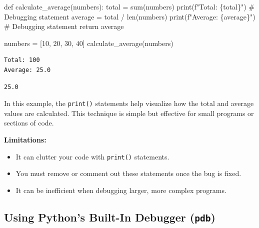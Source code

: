 \documentclass[
  letterpaper,
  DIV=11,
  numbers=noendperiod]{scrreprt}
\newenvironment{Shaded}{\begin{snugshade}}{\end{snugshade}}
\newcommand{\BuiltInTok}[1]{\textcolor[rgb]{0.00,0.23,0.31}{#1}}
\newcommand{\CommentTok}[1]{\textcolor[rgb]{0.37,0.37,0.37}{#1}}
\newcommand{\ControlFlowTok}[1]{\textcolor[rgb]{0.00,0.23,0.31}{#1}}
\newcommand{\DecValTok}[1]{\textcolor[rgb]{0.68,0.00,0.00}{#1}}
\newcommand{\KeywordTok}[1]{\textcolor[rgb]{0.00,0.23,0.31}{#1}}
\newcommand{\NormalTok}[1]{\textcolor[rgb]{0.00,0.23,0.31}{#1}}
\newcommand{\OperatorTok}[1]{\textcolor[rgb]{0.37,0.37,0.37}{#1}}
\newcommand{\SpecialCharTok}[1]{\textcolor[rgb]{0.37,0.37,0.37}{#1}}
\newcommand{\SpecialStringTok}[1]{\textcolor[rgb]{0.13,0.47,0.30}{#1}}
\providecommand{\tightlist}{%
  \setlength{\itemsep}{0pt}\setlength{\parskip}{0pt}}\usepackage{longtable,booktabs,array}
\begin{document}
\begin{Shaded}
\begin{Highlighting}[]
\KeywordTok{def}\NormalTok{ calculate\_average(numbers):}
\NormalTok{    total }\OperatorTok{=} \BuiltInTok{sum}\NormalTok{(numbers)}
    \BuiltInTok{print}\NormalTok{(}\SpecialStringTok{f"Total: }\SpecialCharTok{\{}\NormalTok{total}\SpecialCharTok{\}}\SpecialStringTok{"}\NormalTok{)  }\CommentTok{\# Debugging statement}
\NormalTok{    average }\OperatorTok{=}\NormalTok{ total }\OperatorTok{/} \BuiltInTok{len}\NormalTok{(numbers)}
    \BuiltInTok{print}\NormalTok{(}\SpecialStringTok{f"Average: }\SpecialCharTok{\{}\NormalTok{average}\SpecialCharTok{\}}\SpecialStringTok{"}\NormalTok{)  }\CommentTok{\# Debugging statement}
    \ControlFlowTok{return}\NormalTok{ average}

\NormalTok{numbers }\OperatorTok{=}\NormalTok{ [}\DecValTok{10}\NormalTok{, }\DecValTok{20}\NormalTok{, }\DecValTok{30}\NormalTok{, }\DecValTok{40}\NormalTok{]}
\NormalTok{calculate\_average(numbers)}
\end{Highlighting}
\end{Shaded}

\begin{verbatim}
Total: 100
Average: 25.0
\end{verbatim}

\begin{verbatim}
25.0
\end{verbatim}

In this example, the \texttt{print()} statements help visualize how the
total and average values are calculated. This technique is simple but
effective for small programs or sections of code.

\textbf{Limitations:}

\begin{itemize}
\tightlist
\item
  It can clutter your code with \texttt{print()} statements.
\item
  You must remove or comment out these statements once the bug is fixed.
\item
  It can be inefficient when debugging larger, more complex programs.
\end{itemize}

\hypertarget{using-pythons-built-in-debugger-pdb}{%
\subsection{\texorpdfstring{Using Python's Built-In Debugger
(\texttt{pdb})}{Using Python's Built-In Debugger (pdb)}}\label{using-pythons-built-in-debugger-pdb}}
\end{document}
